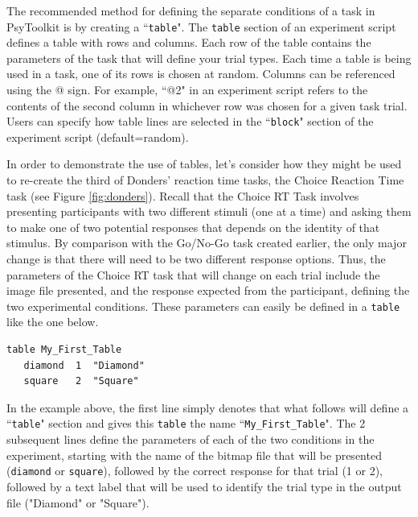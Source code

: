 The recommended method for defining the separate conditions of a task in PsyToolkit is by creating a ``\texttt{table}".  The \texttt{table} section of an experiment script defines a table with rows and columns. Each row of the table contains the parameters of the task that will define your trial types. Each time a table is being used in a task, one of its rows is chosen at random. Columns can be referenced using the @ sign. For example, ``@2" in an experiment script refers to the contents of the second column in whichever row was chosen for a given task trial. Users can specify how table lines are selected in the ``\texttt{block}" section of the experiment script (default=random).

In order to demonstrate the use of tables, let's consider how they might be used to re-create the third of Donders' reaction time tasks, the Choice Reaction Time task (see Figure \ref{fig:donders}).  Recall that the Choice RT Task involves presenting participants with two different stimuli (one at a time) and asking them to make one of two potential responses that depends on the identity of that stimulus.  By comparison with the Go/No-Go task created earlier, the only major change is that there will need to be two different response options.  Thus, the parameters of the Choice RT task that will change on each trial include the image file presented, and the response expected from the participant, defining the two experimental conditions. These parameters can easily be defined in a \texttt{table} like the one below.

\begin{Verbatim}[xleftmargin=2in]
table My_First_Table
   diamond  1  "Diamond"
   square   2  "Square"
\end{Verbatim}

In the example above, the first line simply denotes that what follows will define a ``\texttt{table}" section and gives this \texttt{table} the name ``\texttt{My\_First\_Table}".  The 2 subsequent lines define the parameters of each of the two conditions in the experiment, starting with the name of the bitmap file that will be presented (\texttt{diamond} or \texttt{square}), followed by the correct response for that trial (1 or 2), followed by a text label that will be used to identify the trial type in the output file ("Diamond" or "Square").

